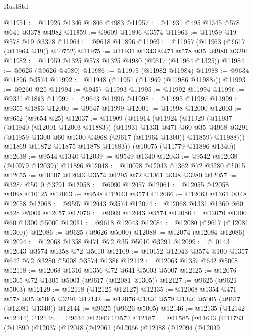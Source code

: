 \begin{lexlean}{RustStd}
\begin{coremodule}
{\begin{coremodule}
{{{{{{{{{{{{{{{{{{{{{{{{{{{{{{{{{@11951 := @11926 @1346 @1806 @4983
@11957 := @11931 @495 @1345 @578 @641 @3378 @4982
@11959 := @9609 @11896 @3574
@11963 := @11959 @19 @578 @19 @3378
@11964 := @9618 @11896
@11969 := @11957 (@11963 (@9617 (@11964 @19)) @10752)
@11975 := @11931 @1343 @471 @578 @35 @4980 @3291
@11982 := @11959 @1325 @578 @1325 @4980 (@9617 (@11964 @1325))
@11984 := @9625 (@9626 @4980)
@11986 := @11975 (@11982 @11984)
@11988 := @9634 @11896 @3574
@11992 := @11948 (@11951 (@11969 (@11986 @11988)))
@11993 := @9260 @25
@11994 := @9457 @11993
@11995 := @11992 @11994
@11996 := @9331 @1863
@11997 := @9643 @11996
@11998 := @11995 @11997
@11999 := @9355 @1863
@12000 := @9647 @11999
@12001 := @11998 @12000
@12003 := @9652 (@9654 @25)
@12037 := @11909
    (@11914
      (@11924
        (@11929
          (@11937
            (@11940 (@12001 @12003 @11883))
            (@11931
              @1331
              @471
              @60
              @35
              @4968
              @3291
              (@11959 @1300 @60 @1300 @4968 (@9617 (@11964 @1300)) @11859)
              @11988)))
        @11869
        @11872
        @11875
        @11878
        @11883))
    (@10075 (@11779 @11896 @1340))
@12038 := @9544 @1340
@12039 := @9549 @1340
@12043 := @9542 (@12038 (@10979 @12039)) @11896
@12048 := @10098 @12043 @1362 @72 @3280 @5015
@12055 := @10107 @12043 @3574 @1295 @72 @1361 @348 @3280
@12057 := @3287 @5010 @3291
@12058 := @6090 @12057
@12061 := @12055 @12058 @4998 @10125
@12063 := @9588 @12043 @3574
@12066 := @12063 @1361 @348 @12058
@12068 := @9597 @12043 @3574
@12074 := @12068 @1331 @1360 @60 @328 @5000 @12057
@12076 := @9609 @12043 @3574
@12080 := @12076 @1300 @60 @1300 @5000
@12081 := @9618 @12043
@12084 := @12080 (@9617 (@12081 @1300))
@12086 := @9625 (@9626 @5000)
@12088 := @12074 (@12084 @12086)
@12094 := @12068 @1358 @471 @72 @35 @5010 @3291
@12099 := @10143 @12043 @3574 @1358 @72 @5010
@12109 := @10152 @12043 @3574 @100 @1357 @642 @72 @3280 @5008 @3574 @1386
@12112 := @12063 @1357 @642 @5008
@12118 := @12068 @1316 @1356 @72 @641 @5003 @5007
@12125 := @12076 @1305 @72 @1305 @5003 (@9617 (@12081 @1305))
@12127 := @9625 (@9626 @5003)
@12129 := @12118 (@12125 @12127)
@12135 := @12068 @1354 @471 @578 @35 @5005 @3291
@12142 := @12076 @1340 @578 @1340 @5005 (@9617 (@12081 @1340))
@12144 := @9625 (@9626 @5005)
@12146 := @12135 (@12142 @12144)
@12148 := @9634 @12043 @3574
@12187 := @11585
    (@11643
      (@11783
        (@11890
          (@12037
            (@12048
              (@12061
                (@12066
                  (@12088
                    (@12094
                      (@12099
}}}}}}}}}}}}}}}}}}}}}}}}}}}}}}}}}
\end{coremodule}}
\end{coremodule}
\end{lexlean}

